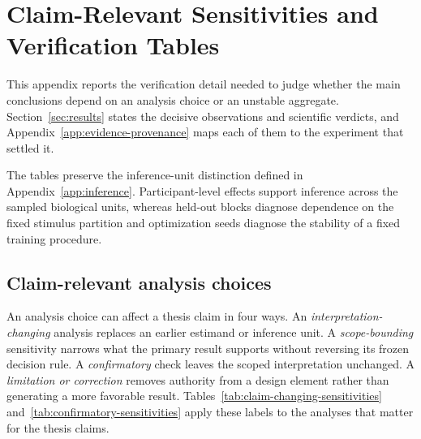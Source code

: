 \section{Claim-Relevant Sensitivities and Verification Tables}
\label{app:sensitivities}

This appendix reports the verification detail needed to judge whether the main conclusions depend on an analysis choice or an unstable aggregate.
Section~\ref{sec:results} states the decisive observations and scientific verdicts, and Appendix~\ref{app:evidence-provenance} maps each of them to the experiment that settled it.

The tables preserve the inference-unit distinction defined in Appendix~\ref{app:inference}.
Participant-level effects support inference across the sampled biological units, whereas held-out blocks diagnose dependence on the fixed stimulus partition and optimization seeds diagnose the stability of a fixed training procedure.

\subsection{Claim-relevant analysis choices}

An analysis choice can affect a thesis claim in four ways.
An \emph{interpretation-changing} analysis replaces an earlier estimand or inference unit.
A \emph{scope-bounding} sensitivity narrows what the primary result supports without reversing its frozen decision rule.
A \emph{confirmatory} check leaves the scoped interpretation unchanged.
A \emph{limitation or correction} removes authority from a design element rather than generating a more favorable result.
Tables~\ref{tab:claim-changing-sensitivities} and~\ref{tab:confirmatory-sensitivities} apply these labels to the analyses that matter for the thesis claims.

